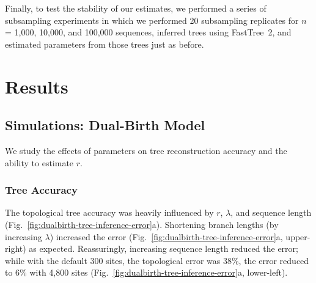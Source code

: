 Finally, to test the stability of our estimates, we performed a series of subsampling experiments in which we performed 20 subsampling replicates for $n$ = 1,000, 10,000, and 100,000 sequences, inferred trees using FastTree~2, and estimated parameters from those trees just as before.

\section{Results}
\subsection{Simulations: Dual-Birth Model}
We study the effects of parameters on tree reconstruction accuracy and the ability to estimate $r$.

\subsubsection{Tree Accuracy}
The topological tree accuracy was heavily influenced by $r$, $\lambda$, and sequence length (Fig.~\ref{fig:dualbirth-tree-inference-error}a). Shortening branch lengths (by increasing $\lambda$) increased the error (Fig.~\ref{fig:dualbirth-tree-inference-error}a, upper-right) as expected. Reassuringly, increasing sequence length reduced the error; while with the default 300 sites, the topological error was 38\%, the  error reduced to 6\% with 4,800 sites (Fig.~\ref{fig:dualbirth-tree-inference-error}a, lower-left).

